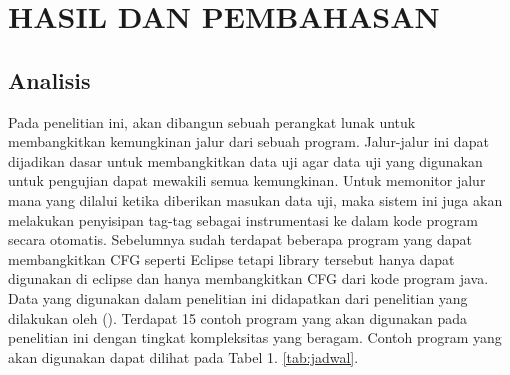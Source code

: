 \section*{HASIL DAN PEMBAHASAN}

\subsection*{Analisis}
Pada penelitian ini, akan dibangun sebuah perangkat lunak untuk membangkitkan kemungkinan jalur dari sebuah program. Jalur-jalur ini dapat dijadikan dasar untuk membangkitkan data uji agar data uji yang digunakan untuk pengujian dapat mewakili semua kemungkinan. Untuk memonitor jalur mana yang dilalui ketika diberikan masukan data uji, maka sistem ini juga akan melakukan penyisipan tag-tag sebagai instrumentasi ke dalam kode program secara otomatis.
Sebelumnya sudah terdapat beberapa program yang dapat membangkitkan CFG seperti Eclipse tetapi library tersebut hanya dapat digunakan di eclipse dan hanya membangkitkan CFG dari kode program java. 
Data yang digunakan dalam penelitian ini didapatkan dari penelitian yang dilakukan oleh \citeauthor{HERMADI2015} (\cite*{HERMADI2015}). Terdapat 15 contoh program yang akan digunakan pada penelitian ini dengan tingkat kompleksitas yang beragam. Contoh program yang akan digunakan dapat dilihat pada Tabel 1.
 \ref{tab:jadwal}.
 
